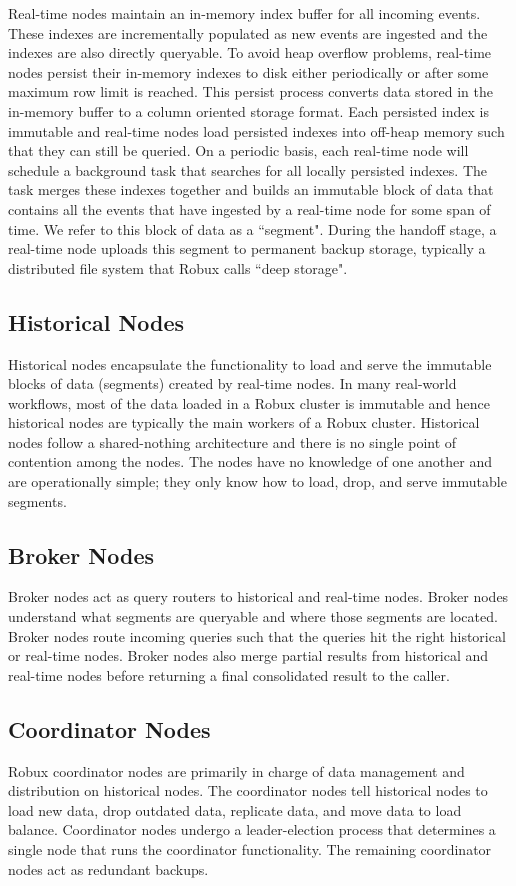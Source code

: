 \documentclass{vldb}
\begin{document}
Real-time nodes maintain an in-memory index buffer for all incoming events.
These indexes are incrementally populated as new events are ingested and the
indexes are also directly queryable. To avoid heap overflow problems, real-time
nodes persist their in-memory indexes to disk either periodically or after some
maximum row limit is reached. This persist process converts data stored in the
in-memory buffer to a column oriented storage format. Each persisted index is
immutable and real-time nodes load persisted indexes into off-heap memory such
that they can still be queried. On a periodic basis, each real-time node will
schedule a background task that searches for all locally persisted indexes. The
task merges these indexes together and builds an immutable block of data that
contains all the events that have ingested by a real-time node for some span of
time. We refer to this block of data as a ``segment". During the handoff stage,
a real-time node uploads this segment to permanent backup storage, typically
a distributed file system that Robux calls ``deep storage".

\subsection{Historical Nodes}
Historical nodes encapsulate the functionality to load and serve the immutable
blocks of data (segments) created by real-time nodes. In many real-world
workflows, most of the data loaded in a Robux cluster is immutable and hence
historical nodes are typically the main workers of a Robux cluster.  Historical
nodes follow a shared-nothing architecture and there is no single point of
contention among the nodes. The nodes have no knowledge of one another and are
operationally simple; they only know how to load, drop, and serve immutable
segments.

\subsection{Broker Nodes}
Broker nodes act as query routers to historical and real-time nodes. Broker
nodes understand what segments are queryable and where those segments are
located. Broker nodes route incoming queries such that the queries hit the
right historical or real-time nodes. Broker nodes also merge partial results
from historical and real-time nodes before returning a final consolidated
result to the caller.

\subsection{Coordinator Nodes}
Robux coordinator nodes are primarily in charge of data management and
distribution on historical nodes. The coordinator nodes tell historical nodes
to load new data, drop outdated data, replicate data, and move data to load
balance. Coordinator nodes undergo a
leader-election process that determines a single node that runs the coordinator
functionality. The remaining coordinator nodes act as redundant backups.
\end{document}
